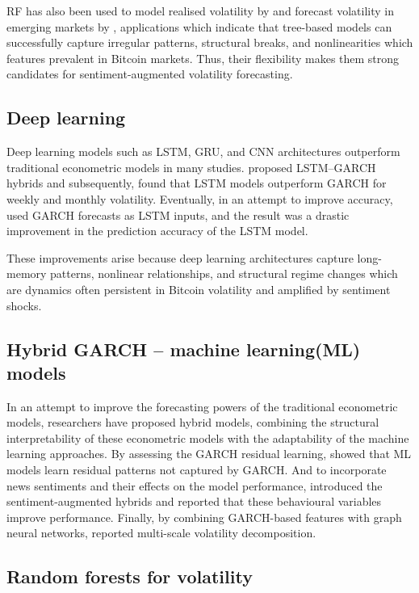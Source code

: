 \documentclass[12pt]{report}
\begin{document}
RF has also been used to model realised volatility by \citep{luong2018harjl} and forecast volatility in emerging markets  by \citep{diane2024southafrica}, applications which indicate that tree-based models can successfully capture irregular patterns, structural breaks, and nonlinearities which features prevalent in Bitcoin markets. Thus, their flexibility makes them strong candidates for sentiment-augmented volatility forecasting.


\subsection{Deep learning}

Deep learning models such as LSTM, GRU, and CNN architectures outperform traditional econometric models in many studies. \cite{kimwon2018lstmhybrid} proposed LSTM–GARCH hybrids and subsequently, \cite{wang2023cryptoML} found that LSTM models outperform GARCH for weekly and  monthly volatility. Eventually, in an attempt to improve accuracy, \cite{han2025combinedmethod} used GARCH forecasts as LSTM inputs, and the result was a drastic improvement in the prediction accuracy of the LSTM model.

These improvements arise because deep learning architectures capture long-memory patterns, nonlinear relationships, and structural regime changes which are dynamics often persistent in Bitcoin volatility and amplified by sentiment shocks.


\subsection{Hybrid GARCH -- machine learning(ML) models}
In an attempt to improve the forecasting powers of the traditional econometric models, researchers have proposed hybrid models, combining the structural interpretability of these econometric models with the adaptability of the machine learning approaches. By assessing the GARCH residual learning, \citep{zahidetal2022hybridgarch} showed that ML models learn residual patterns not captured by GARCH. And to incorporate news sentiments and their effects on the model performance, \citep{leberegyed2025sentimentlstm} introduced the sentiment-augmented hybrids and reported that these behavioural variables improve performance. Finally, by combining GARCH-based features with graph neural networks, \citep{yu2025genshin} reported multi-scale volatility decomposition.

\subsection{Random forests for volatility}
\end{document}
